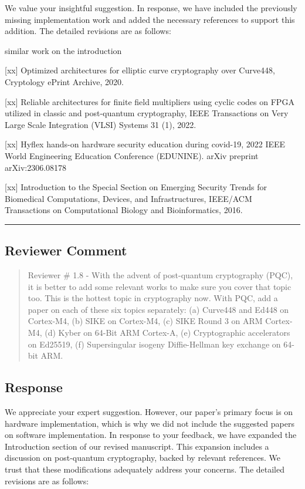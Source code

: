 We value your insightful suggestion. In response, we have included the previously missing implementation work and added the necessary references to support this addition. The detailed revisions are as follows:

\color{blue}

similar work on the introduction

	[xx] Optimized architectures for elliptic curve cryptography over Curve448, Cryptology ePrint Archive, 2020.

	[xx] Reliable architectures for finite field multipliers using cyclic codes on FPGA utilized in classic and post-quantum cryptography, IEEE Transactions on Very Large Scale Integration (VLSI) Systems 31 (1), 2022.

	[xx] Hyflex hands-on hardware security education during covid-19, 2022 IEEE World Engineering Education Conference (EDUNINE).
arXiv preprint arXiv:2306.08178

[xx] Introduction to the Special Section on Emerging Security Trends for Biomedical Computations, Devices, and Infrastructures, IEEE/ACM Transactions on Computational Biology and Bioinformatics, 2016.


\color{black}


\noindent\rule{\linewidth}{2.0pt}

\subsection{Reviewer Comment}
\begin{mdframed}
	\begin{quote}
		Reviewer \# 1.8 - With the advent of post-quantum cryptography (PQC), it is better to add some relevant works to make sure you cover that topic too. This is the hottest topic in cryptography now. With PQC, add a paper on each of these six topics separately: (a) Curve448 and Ed448 on Cortex-M4, (b) SIKE on Cortex-M4, (c) SIKE Round 3 on ARM Cortex-M4, (d) Kyber on 64-Bit ARM Cortex-A, (e) Cryptographic accelerators on Ed25519, (f) Supersingular isogeny Diffie-Hellman key exchange on 64-bit ARM.
	\end{quote}
\end{mdframed}

\subsection{Response}

We appreciate your expert suggestion. However, our paper's primary focus is on hardware implementation, which is why we did not include the suggested papers on software implementation. In response to your feedback, we have expanded the Introduction section of our revised manuscript. This expansion includes a discussion on post-quantum cryptography, backed by relevant references. We trust that these modifications adequately address your concerns. The detailed revisions are as follows:

